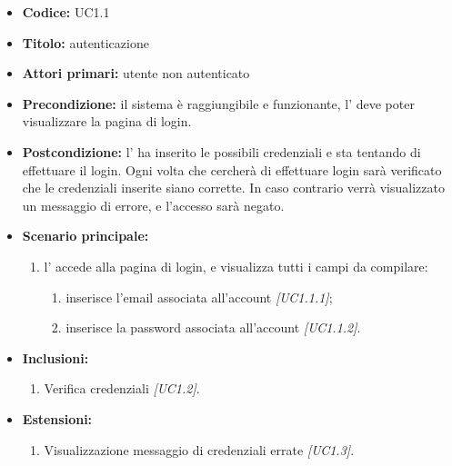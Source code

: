 \documentclass[casi-duso]{subfiles}
\begin{document}



\begin{itemize}
  \item \textbf{Codice:} UC1.1
  \item \textbf{Titolo:} autenticazione
  \item \textbf{Attori primari:} utente non autenticato
  \item \textbf{Precondizione:} il sistema è raggiungibile e funzionante, l' deve poter visualizzare la pagina di login.
  \item \textbf{Postcondizione:} l' ha inserito le possibili credenziali e sta tentando di effettuare il login. Ogni volta che cercherà di effettuare
        login sarà verificato che le credenziali inserite siano corrette. In caso contrario verrà visualizzato un messaggio di errore, e l'accesso sarà negato.
  \item \textbf{Scenario principale:} 
  \begin{enumerate}
    \item  l' accede alla pagina di login, e visualizza tutti i campi da compilare:
    \begin{enumerate}
      \item inserisce l’email associata all’account \emph{[UC1.1.1]};
      \item inserisce la password associata all’account \emph{[UC1.1.2]}.
    \end{enumerate}
  \end{enumerate}
  \item \textbf{Inclusioni:}
  \begin{enumerate}
    \item Verifica credenziali \emph{[UC1.2]}.
  \end{enumerate}
  \item \textbf{Estensioni:}
  \begin{enumerate}
    \item Visualizzazione messaggio di credenziali errate \emph{[UC1.3]}.
  \end{enumerate}
\end{itemize}
\end{document}
